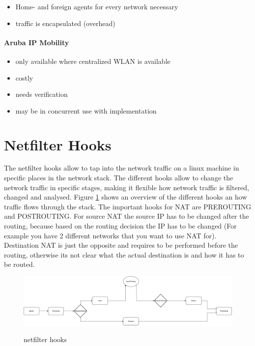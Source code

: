 \documentclass{report}
\begin{document}
\begin{itemize}
\itemsep1pt\parskip0pt
\item
  Home- and foreign agents for every network necessary
\item
  traffic is encapsulated (overhead)
\end{itemize}

\paragraph{Aruba IP Mobility}\label{aruba-ip-mobility}

\begin{itemize}
\itemsep1pt\parskip0pt
\item
  only available where centralized WLAN is available
\item
  costly
\item
  needs verification
\item
  may be in concurrent use with implementation
\end{itemize}


\section{Netfilter Hooks}\label{netfilter-hooks}

The netfilter hooks\cite{hooks} allow to tap into the network traffic on a linux
machine in specific places in the network stack. The different hooks
allow to change the network traffic in specific stages, making it
flexible how network traffic is filtered, changed and analysed. Figure \ref{Hooks.pdf} shows an overview of the different hooks an how traffic flows
through the stack. The important hooks for NAT are PREROUTING and
POSTROUTING. For source NAT the source IP has to be changed after the
routing, because based on the routing decision the IP has to be changed
(For example you have 2 different networks that you want to use NAT
for). Destination NAT is just the opposite and requires to be performed
before the routing, otherwise its not clear what the actual destination
is and how it has to be routed.

\begin{figure}[ht]
	\centering
	\includegraphics[width=\textwidth]{../Hooks.pdf}
	\label{Hooks.pdf}
	\caption{netfilter hooks}  
\end{figure}
\end{document}
